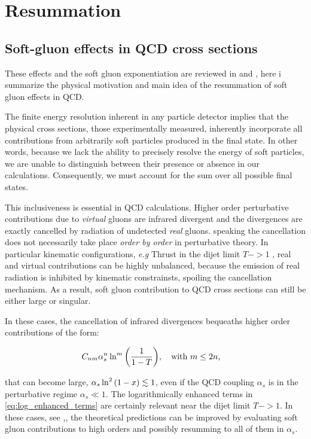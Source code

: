 \documentclass[../main.tex]{subfiles}
\begin{document}
\section{Resummation}


\subsection{Soft-gluon effects in QCD cross sections}

These effects and the soft gluon exponentiation are reviewed in \cite{Catani_1997} and \cite{catani1997softgluon}, here i summarize the physical 
motivation and main idea of the resummation of soft gluon effects in QCD.

The finite energy resolution inherent in any particle detector implies that the physical cross sections, 
those experimentally measured, inherently incorporate all contributions from arbitrarily soft particles 
produced in the final state. In other words, because we lack the ability to precisely resolve the energy 
of soft particles, we are unable to distinguish between their presence or absence in our calculations. 
Consequently, we must account for the sum over all possible final states.

This inclusiveness is essential in QCD calculations. Higher order perturbative contributions due to \emph{virtual}
gluons are infrared divergent and the divergences are exactly  cancelled by radiation of undetected \emph{real} gluons.
speaking the cancellation does not necessarily take place \emph{order by order} in perturbative theory.
In particular kinematic configurations, \emph{e.g} Thrust in the dijet limit $T->1$ ,   
real and virtual contributions can be highly unbalanced, because the emission of real radiation is inhibited by kinematic constrainsts,
spoiling the cancellation mechanism. As a result, soft gluon contribution to QCD cross sections can still be either large or singular.

In these cases, the cancellation of infrared divergences bequeaths higher order contributions of the form:

\begin{equation}\label{eq:log_enhanced_terms}
    C_{nm} \alpha_s^n \ln^m\qty(\frac{1}{1-T}) , \qq{with $m \le 2n $,}
\end{equation}

that can become large, $\alpha_s \ln^2\qty(1-x)\lesssim 1$, even if the QCD coupling $\alpha_s$ is in the perturbative regime $\alpha_s \ll 1$.
The logarithmically enhanced terms in \cref{eq:log_enhanced_terms} are certainly relevant near the dijet limit $T->1$.
In these cases, see \cite{CATANI19933},\cite{Catani:2003zt}, the theoretical predictions can be improved by evaluating soft gluon 
contributions to high orders and possibly resumming to all of them in $\alpha_s$.
\end{document}
